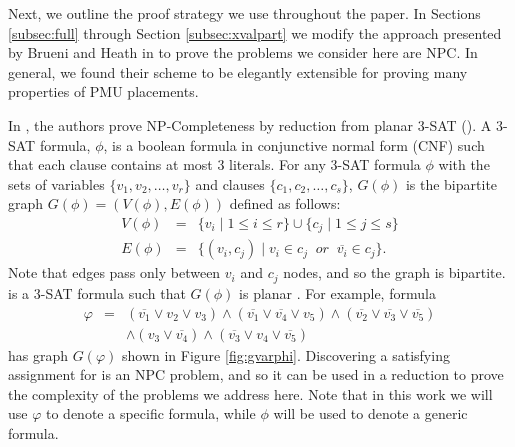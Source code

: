 Next, we outline the proof strategy we use throughout the paper. In Sections  \ref{subsec:full} through Section \ref{subsec:xvalpart} we modify the approach presented
by Brueni and Heath in \cite{Brueni05} to prove the problems we consider here are NPC. 
In general, we found their scheme to be elegantly extensible for proving many properties of PMU placements.

In \cite{Brueni05}, the authors prove NP-Completeness by reduction from planar 3-SAT (\sats). A 3-SAT formula, $\phi$, is a boolean formula in conjunctive normal form (CNF) such that each clause contains at most $3$ literals. For any 3-SAT formula $\phi$ with the sets of variables $\{v_1,v_2, \dots , v_r\}$ and clauses $\{c_1,c_2, \dots , c_s \}$, $G(\phi)$ is the bipartite graph $G(\phi)=(V(\phi),E(\phi))$ defined as follows:
\begin{eqnarray*}
 V(\phi) &= &\{v_i\; \vert\; 1 \leq i \leq r \} \cup \{c_j \;\vert\; 1 \leq j \leq s \} \\
 E(\phi) &=& \{ (v_i,c_j)\;\vert\; v_i \in c_j\;\; or \;\; \overline{v_i} \in c_j\}.
\end{eqnarray*}
Note that edges pass only between $v_i$ and $c_j$ nodes, and so the graph is bipartite.  \sat is a 3-SAT formula such that $G(\phi)$ is planar \cite{Lich82}. For example, \sat formula
\begin{eqnarray}
	 \varphi &=& (\overline{v_1} \vee v_2 \vee v_3) \wedge (\overline{v_1} \vee \overline{v_4} \vee v_5) \wedge (\overline{v_2} \vee \overline{v_3} \vee \overline{v_5}) \nonumber\\
	 & & \wedge (v_3 \vee \overline{v_4}) \wedge  (\overline{v_3} \vee v_4 \vee \overline{v_5})
\label{eqn:varphi}
\end{eqnarray}
has graph $G(\varphi)$ shown in Figure \ref{fig:gvarphi}. Discovering a satisfying assignment for  \sat is an NPC problem, and so it can be used in a reduction to prove the complexity of the problems we address here. Note that in this work we will use $\varphi$ to denote a specific \sat formula, while $\phi$ will be used to denote a generic \sat formula.

